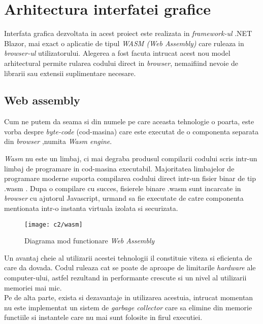 \section{Arhitectura interfatei grafice}
Interfata grafica dezvoltata in acest proiect este realizata in \textit{framework-ul} .NET Blazor, mai exact o aplicatie de tipul \textit{WASM (Web Assembly)} care ruleaza in \textit{browser-ul} utilizatorului. Alegerea a fost facuta intrucat acest nou model arhitectural permite rularea codului direct in \textit{browser}, nemaifiind nevoie de librarii sau extensii suplimentare necesare.\\

\newpage
\subsection*{Web assembly} 
Cum ne putem da seama si din numele pe care aceasta tehnologie o poarta, este vorba despre \textit{byte-code} (cod-masina) care este executat de o componenta separata din \textit{browser} ,numita \textit{Wasm engine}.

\textit{Wasm} nu este un limbaj, ci mai degraba produsul compilarii codului scris intr-un limbaj de programare in cod-masina executabil. Majoritatea limbajelor de programare moderne  suporta compilarea codului direct intr-un fisier  binar de tip .wasm . Dupa o compilare cu succes, fisierele binare .wasm sunt incarcate in \textit{browser} cu ajutorul Javascript, urmand sa fie executate de catre componenta mentionata intr-o instanta virtuala izolata si securizata.\\

\vspace{1cm}
\begin{figure}[h]
	\centering
	
	\texttt{[image: c2/wasm]}
	\caption{Diagrama mod functionare \textit{Web Assembly}}
\end{figure}

Un avantaj cheie al utilizarii acestei tehnologii il constituie viteza si eficienta de care da dovada. Codul ruleaza cat se poate de aproape de limitarile \textit{hardware} ale computer-ului, astfel rezultand in performante crescute si un nivel al utilizarii memoriei mai mic.\\
Pe de alta parte, exista si dezavantaje in utilizarea acestuia, intrucat momentan nu este implementat un sistem de \textit{garbage collector} care sa elimine din memorie functiile si instantele care nu mai sunt folosite in firul executiei.

